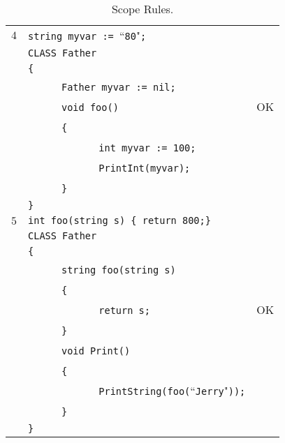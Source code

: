 \documentclass{article}
\begin{document}
\begin{table}[h]
\begin{tabular}{|l|l|l|}
\hline
 $4$ & \verb"string myvar := "``\verb"80""\verb";" &    \\
     & \verb"CLASS Father"                         &    \\
     & \verb"{"                                    &    \\
     & ~ ~ ~ ~\verb"Father myvar := nil;"          &    \\
     & ~ ~ ~ ~\verb"void foo()"                    & OK \\
     & ~ ~ ~ ~\verb"{"                             &    \\
     & ~ ~ ~ ~ ~ ~ ~ ~\verb"int myvar := 100;"     &    \\
     & ~ ~ ~ ~ ~ ~ ~ ~\verb"PrintInt(myvar);"      &    \\
     & ~ ~ ~ ~\verb"}"                             &    \\
     & \verb"}"                                    &    \\
\hline
 $5$ & \verb"int foo(string s) { return 800;}"    &    \\
     & \verb"CLASS Father"                        &    \\
     & \verb"{"                                   &    \\
     & ~ ~ ~ ~\verb"string foo(string s)"         &    \\
     & ~ ~ ~ ~\verb"{"                            &    \\
     & ~ ~ ~ ~ ~ ~ ~ ~\verb"return s;"            & OK \\
     & ~ ~ ~ ~\verb"}"                            &    \\
     & ~ ~ ~ ~\verb"void Print()"                 &    \\
     & ~ ~ ~ ~\verb"{"                            &    \\
     & ~ ~ ~ ~ ~ ~ ~ ~\verb"PrintString(foo("``\verb"Jerry""\verb"));"  & \\
     & ~ ~ ~ ~\verb"}"                            &    \\
     & \verb"}"                                   &    \\
\hline
\end{tabular}
\caption{Scope Rules.
\label{Table_Code_Examples_Scope_Rules}}
\end{table}
\end{document}

